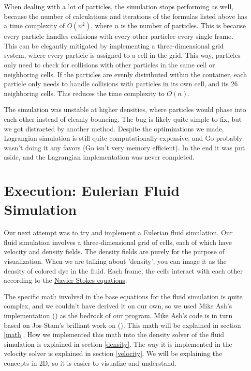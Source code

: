 \documentclass[a4paper,12pt]{article}
\begin{document}
When dealing with a lot of particles, the simulation stops performing as well,
because the number of calculations and iterations of the formulas listed above
has a time complexity of $O(n^2)$, where $n$ is the number of particles. This is
because every particle handles collisions with every other particlee every
single frame. This can be elegantly mitigated by implementing a three-dimensional
grid system, where every particle is assigned to a cell in the grid. This way,
particles only need to check for collisions with other particles in the same cell
or neighboring cells. If the particles are evenly distributed within the container,
each particle only needs to handle collisions with particles in its own cell, and
its 26 neighboring cells. This reduces the time complexity to $O(n)$.

The simulation was unstable at higher densities, where particles would phase
into each other instead of cleanly bouncing. The bug is likely quite simple to
fix, but we got distracted by another method. Despite the optimizations we
made, Lagrangian simulation is still quite computationally expensive, and Go
probably wasn't doing it any favors (Go isn't very memory efficient). In the
end it was put aside, and the Lagrangian implementation was never completed.

\pagebreak
\section{Execution: Eulerian Fluid Simulation}
Our next attempt was to try and implement a Eulerian fluid simulation.
Our fluid simulation involves a three-dimensional grid of cells, each of which
have velocity and density fields. The density fields are purely for the purpose of visualization. When we are talking about 'density',
you can image it as the density of colored dye in the fluid. 
Each frame, the cells interact with each
other according to the \href{https://en.wikipedia.org/wiki/Navier%E2%80%93Stokes_equations}{Navier-Stokes equations}.

The specific math involved in the base equations for the fluid simulation is
quite complex, and we couldn't have derived it on our own, so we used
Mike Ash's implementation \href{www.mikeash.com/pyblog/fluid-simulation-for-dummies.html}{} (\cite{mikeash})
as the bedrock of our program. Mike Ash's code is in turn based on Jos Stam's
brilliant work on \href{www.dgp.toronto.edu/public_user/stam/reality/Research/pdf/GDC03.pdf}{} (\cite{josstam}).
This math will be explained in section \ref{math}. 
How we implemented this math into the density solver of the fluid simulation is explained in section \ref{density}.
The way it is implemented in the velocity solver is explained in section \ref{velocity}.
We will be explaining the concepts in 2D, so it is easier to visualize and understand. 
\end{document}
